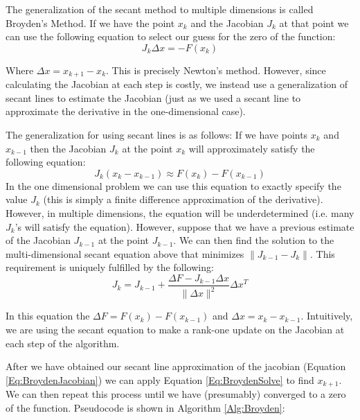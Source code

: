 The generalization of the secant method to multiple dimensions is called Broyden's Method.  If we have the point $x_k$ and the Jacobian $J_k$ at that point we can use the following equation to select our guess for the zero of the function:
\begin{equation} \label{Eq:BroydenSolve}
J_k \Delta x = -F(x_k)
\end{equation}

Where $\Delta x = x_{k+1}-x_k$. This is precisely Newton's method. However, since calculating the Jacobian at each step is costly, we instead use a generalization of secant lines to estimate the Jacobian (just as we used a secant line to approximate the derivative in the one-dimensional case).

The generalization for using secant lines is as follows: If we have points $x_k$ and $x_{k-1}$ then the Jacobian $J_k$ at the point $x_k$ will approximately satisfy the following equation:
\begin{equation}
J_k (x_k-x_{k-1}) \approx F(x_k) - F(x_{k-1})
\end{equation}
In the one dimensional problem we can use this equation to exactly specify the value $J_k$ (this is simply a finite difference approximation of the derivative). However, in multiple dimensions, the equation will be underdetermined (i.e. many $J_k$'s will satisfy the equation). However, suppose that we have a previous estimate of the Jacobian $J_{k-1}$ at the point $J_{k-1}$. We can then find the solution to the multi-dimensional secant equation above that minimizes $\|J_{k-1}-J_k\|$. This requirement is uniquely fulfilled by the following:
\begin{equation} \label{Eq:BroydenJacobian}
J_k = J_{k-1} + \frac{\Delta F-J_{k-1} \Delta x}{\|\Delta x\|^2}\Delta x^T
\end{equation}

In this equation the $\Delta F = F(x_k)-F(x_{k-1})$ and $\Delta x = x_k-x_{k-1}$. Intuitively, we are using the secant equation to make a rank-one update on the Jacobian at each step of the algorithm.

After we have obtained our secant line approximation of the jacobian (Equation \ref{Eq:BroydenJacobian}) we can apply Equation \ref{Eq:BroydenSolve} to find $x_{k+1}$. We can then repeat this process until we have (presumably) converged to a zero of the function. Pseudocode is shown in Algorithm \ref{Alg:Broyden}:

